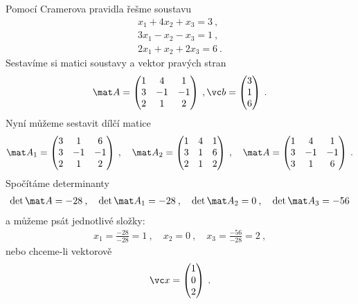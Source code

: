 \begin{example}
    Pomocí Cramerova pravidla řešme soustavu 
    \begin{align}
        x_1 + 4 x_2 + x_3 = 3 \:, \\ 3 x_1 - x_2 - x_3 = 1 \:, \\ 2x_1 + x_2 + 2x_3 = 6 \:.
    \end{align}
    Sestavíme si matici soustavy a vektor pravých stran
    \begin{align}
        \mat A  = \begin{pmatrix}
            1 & 4 & 1 \\ 3 & -1 & -1 \\ 2 & 1 & 2
        \end{pmatrix} \:,
        \vc b = \begin{pmatrix}
            3 \\ 1 \\ 6
        \end{pmatrix} \:.
    \end{align}
    Nyní můžeme sestavit dílčí matice
    \begin{align}
        \mat A_1 = \begin{pmatrix}
            3 & 1 & 6 \\ 3 & -1 & -1 \\ 2 & 1 & 2
        \end{pmatrix}
        \:, \quad
        \mat A_2  = \begin{pmatrix}
            1 & 4 & 1 \\ 3 & 1 & 6 \\ 2 & 1 & 2
        \end{pmatrix} \:, \quad
        \mat A  = \begin{pmatrix}
            1 & 4 & 1 \\ 3 & -1 & -1 \\ 3 & 1 & 6
        \end{pmatrix} \:.
    \end{align}
    Spočítáme determinanty
    \begin{align}
        \det \mat A = -28 \:, \quad \det \mat A_1 = -28 \:, \quad \det \mat A_2 = 0 \:, \quad \det \mat A_3 = -56
    \end{align}
    a můžeme psát jednotlivé složky:
    \begin{align}
        x_1 = \frac{-28}{-28} = 1 \:, \quad x_2 = 0 \:, \quad x_3 = \frac{-56}{-28} = 2 \:,
    \end{align}
    nebo chceme-li vektorově
    \begin{align}
        \vc x = \begin{pmatrix}
            1 \\ 0 \\ 2
        \end{pmatrix} \:.
    \end{align}
\end{example}

